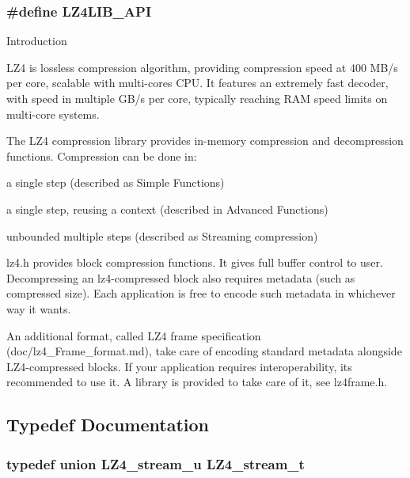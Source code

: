 \subsubsection[{L\+Z4\+L\+I\+B\+\_\+\+A\+P\+I}]{\setlength{\rightskip}{0pt plus 5cm}\#define L\+Z4\+L\+I\+B\+\_\+\+A\+P\+I}\label{compat-lz4_8h_a00a61e1435005f8a621edf4bbe0ef844}
Introduction

L\+Z4 is lossless compression algorithm, providing compression speed at 400 M\+B/s per core, scalable with multi-\/cores C\+P\+U. It features an extremely fast decoder, with speed in multiple G\+B/s per core, typically reaching R\+A\+M speed limits on multi-\/core systems.

The L\+Z4 compression library provides in-\/memory compression and decompression functions. Compression can be done in\+:
\begin{DoxyItemize}
\item a single step (described as Simple Functions)
\item a single step, reusing a context (described in Advanced Functions)
\item unbounded multiple steps (described as Streaming compression)
\end{DoxyItemize}

lz4.\+h provides block compression functions. It gives full buffer control to user. Decompressing an lz4-\/compressed block also requires metadata (such as compressed size). Each application is free to encode such metadata in whichever way it wants.

An additional format, called L\+Z4 frame specification (doc/lz4\+\_\+\+Frame\+\_\+format.\+md), take care of encoding standard metadata alongside L\+Z4-\/compressed blocks. If your application requires interoperability, it\textquotesingle{}s recommended to use it. A library is provided to take care of it, see lz4frame.\+h. 

\subsection{Typedef Documentation}
\hypertarget{compat-lz4_8h_a4fb9ac4ce6d5e25edc9188f9d6633498}{}
\subsubsection[{L\+Z4\+\_\+stream\+\_\+t}]{\setlength{\rightskip}{0pt plus 5cm}typedef union {\bf L\+Z4\+\_\+stream\+\_\+u} {\bf L\+Z4\+\_\+stream\+\_\+t}}\label{compat-lz4_8h_a4fb9ac4ce6d5e25edc9188f9d6633498}
\hypertarget{compat-lz4_8h_a76a1eaa4729efddb43040217daad4d4e}{}
